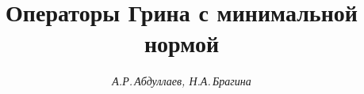 

 


% 


 


\newcommand{\col}{\operatorname{col}} 


\newcommand{\tts}[1]{} 


 




\setcounter{page}{3} 












 


\author{\it А.Р.\,Абдуллаев, Н.А.\,Брагина} 




\title{Операторы Грина с минимальной нормой} 


 


\date{} 




\pagestyle{plain} %


 




\maketitle 


\label{begin} 


 


